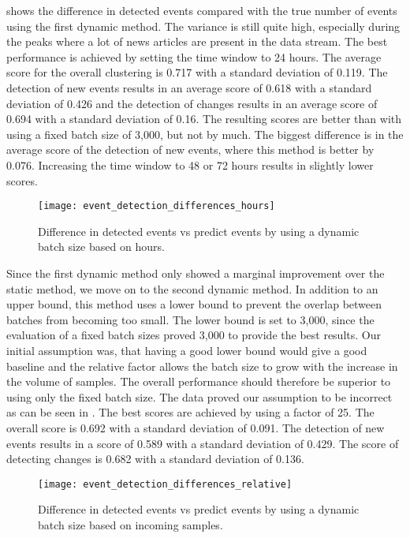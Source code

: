  shows the difference in detected events
compared with the true number of events using the first dynamic method.
The variance is still quite high, especially during the peaks
where a lot of news articles are present in the data stream.
The best performance is achieved by setting the time window to 24 hours.
The average score for the overall clustering is 0.717 with a standard deviation of 0.119.
The detection of new events results in an average score of 0.618 with a standard deviation of 0.426
and the detection of changes results in an average score of 0.694 with a standard deviation of 0.16.
The resulting scores are better than with using a fixed batch size of 3,000, but not by much.
The biggest difference is in the average score of the detection of new events,
where this method is better by 0.076.
Increasing the time window to 48 or 72 hours results in slightly lower scores.

\begin{figure}[h]
    \centering
    \texttt{[image: event\_detection\_differences\_hours]}
    \caption{Difference in detected events vs predict events by using a dynamic batch size based on hours.}
    \label{fig:event_detection_differences_hours}
\end{figure}

Since the first dynamic method only showed a marginal improvement over the static method,
we move on to the second dynamic method.
In addition to an upper bound, this method uses a lower bound
to prevent the overlap between batches from becoming too small.
The lower bound is set to 3,000, since the evaluation of a fixed batch sizes proved 3,000 to provide the best results.
Our initial assumption was, that having a good lower bound
would give a good baseline and the relative factor allows the batch size
to grow with the increase in the volume of samples.
The overall performance should therefore be superior to using only the fixed batch size.
The data proved our assumption to be incorrect as can be seen in .
The best scores are achieved by using a factor of 25.
The overall score is 0.692 with a standard deviation of 0.091.
The detection of new events results in a score of 0.589 with a standard deviation of 0.429.
The score of detecting changes is 0.682 with a standard deviation of 0.136.

\begin{figure}[h]
   \centering
   \texttt{[image: event\_detection\_differences\_relative]}
   \caption{Difference in detected events vs predict events by using a dynamic batch size based on incoming samples.}
   \label{fig:event_detection_differences_relative}
\end{figure}

